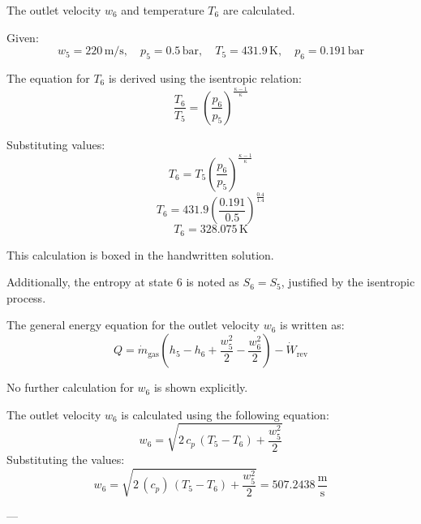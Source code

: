 The outlet velocity \( w_6 \) and temperature \( T_6 \) are calculated.  

Given:  
\[
w_5 = 220 \, \text{m/s}, \quad p_5 = 0.5 \, \text{bar}, \quad T_5 = 431.9 \, \text{K}, \quad p_6 = 0.191 \, \text{bar}
\]  

The equation for \( T_6 \) is derived using the isentropic relation:  
\[
\frac{T_6}{T_5} = \left( \frac{p_6}{p_5} \right)^{\frac{\kappa - 1}{\kappa}}
\]  

Substituting values:  
\[
T_6 = T_5 \left( \frac{p_6}{p_5} \right)^{\frac{\kappa - 1}{\kappa}}
\]  
\[
T_6 = 431.9 \left( \frac{0.191}{0.5} \right)^{\frac{0.4}{1.4}}
\]  
\[
T_6 = 328.075 \, \text{K}
\]  

This calculation is boxed in the handwritten solution.  

Additionally, the entropy at state 6 is noted as \( S_6 = S_5 \), justified by the isentropic process.  

The general energy equation for the outlet velocity \( w_6 \) is written as:  
\[
Q = \dot{m}_{\text{gas}} \left( h_5 - h_6 + \frac{w_5^2}{2} - \frac{w_6^2}{2} \right) - \dot{W}_{\text{rev}}
\]  

No further calculation for \( w_6 \) is shown explicitly.

The outlet velocity \( w_6 \) is calculated using the following equation:  
\[
w_6 = \sqrt{2 \, c_p \, (T_5 - T_6) + \frac{w_5^2}{2}}
\]  
Substituting the values:  
\[
w_6 = \sqrt{2 \, (c_p) \, (T_5 - T_6) + \frac{w_5^2}{2}} = 507.2438 \, \frac{\text{m}}{\text{s}}
\]  

---